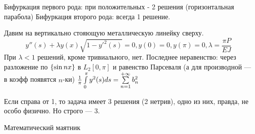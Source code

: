 Бифуркация первого рода: при положительных - 2 решения (горизонтальная парабола)
Бифуркация второго рода: всегда 1 решение.

Давим на вертикально стояющую металлическую линейку сверху.
$$y''(s) + \lambda y(x)\sqrt{1-y'^2(s)} = 0, y(0) = 0, y(\pi) = 0, \lambda = \frac{\pi P}{EJ}$$
При $\lambda < 1$ решений, кроме тривиального, нет.
Последнее неравенство: через разложение по $\left\{\sin nx\right\}$ в $L_2[0, \pi]$ и равенство Парсеваля (а для производной --- в коэфф появятся $n$-ки) $\frac1\pi\int\limits_{0}^{\pi} y^2(s)ds = \sum\limits_{n=1}^{+\infty} b_n^2$

Если справа от 1, то задача имеет 3 решения (2 нетрив), одно из них, правда, не особо физично. Но строго --- 3.


Математический маятник
